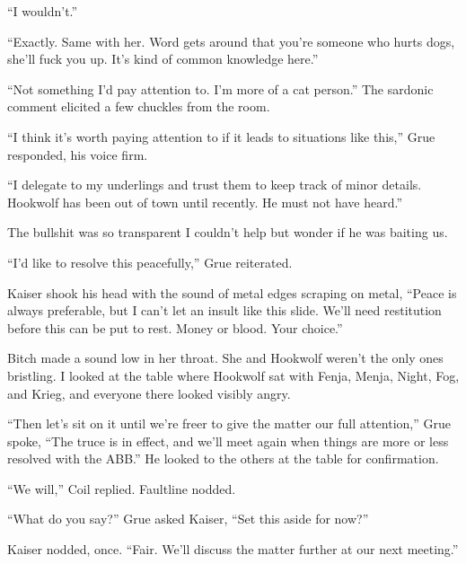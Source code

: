 ``I wouldn't.''



``Exactly.  Same with her.  Word gets around that you're someone who hurts dogs, she'll fuck you up.  It's kind of common knowledge here.''



``Not something I'd pay attention to.  I'm more of a cat person.''  The sardonic comment elicited a few chuckles from the room.



``I think it's worth paying attention to if it leads to situations like this,'' Grue responded, his voice firm.



``I delegate to my underlings and trust them to keep track of minor details.  Hookwolf has been out of town until recently.  He must not have heard.''



The bullshit was so transparent I couldn't help but wonder if he was baiting us.



``I'd like to resolve this peacefully,'' Grue reiterated.



Kaiser shook his head with the sound of metal edges scraping on metal, ``Peace is always preferable, but I can't let an insult like this slide.  We'll need restitution before this can be put to rest.  Money or blood.  Your choice.''



Bitch made a sound low in her throat.  She and Hookwolf weren't the only ones bristling.  I looked at the table where Hookwolf sat with Fenja, Menja, Night, Fog, and Krieg, and everyone there looked visibly angry.



``Then let's sit on it until we're freer to give the matter our full attention,'' Grue spoke, ``The truce is in effect, and we'll meet again when things are more or less resolved with the ABB.''  He looked to the others at the table for confirmation.



``We will,'' Coil replied. Faultline nodded.



``What do you say?'' Grue asked Kaiser, ``Set this aside for now?''



Kaiser nodded, once.  ``Fair.  We'll discuss the matter further at our next meeting.''




